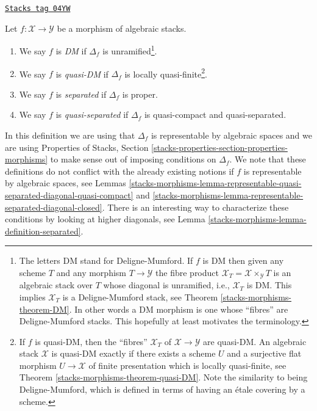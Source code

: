 \begin{definition}[Separated]
\label{stacks-morphisms-definition-separated}
\href{https://stacks.math.columbia.edu/tag/04YW}{\texttt{Stacks tag 04YW}}

Let $f : \mathcal{X} \to \mathcal{Y}$ be a morphism of algebraic stacks.
\begin{enumerate}
\item We say $f$ is {\it DM} if $\Delta_f$ is unramified\footnote{The
letters DM stand for Deligne-Mumford. If $f$ is DM then given any scheme
$T$ and any morphism $T \to \mathcal{Y}$ the fibre product
$\mathcal{X}_T = \mathcal{X} \times_\mathcal{Y} T$
is an algebraic stack over $T$ whose diagonal is unramified, i.e.,
$\mathcal{X}_T$ is DM. This implies $\mathcal{X}_T$
is a Deligne-Mumford stack, see Theorem \ref{stacks-morphisms-theorem-DM}.
In other words a DM morphism is one whose ``fibres'' are Deligne-Mumford
stacks. This hopefully at least motivates the terminology.}.
\item We say $f$ is {\it quasi-DM} if $\Delta_f$ is
locally quasi-finite\footnote{If $f$ is quasi-DM, then the
``fibres'' $\mathcal{X}_T$ of $\mathcal{X} \to \mathcal{Y}$ are quasi-DM. An
algebraic stack $\mathcal{X}$ is quasi-DM exactly if there exists a
scheme $U$ and a surjective flat morphism $U \to \mathcal{X}$ of finite
presentation which is locally quasi-finite, see
Theorem \ref{stacks-morphisms-theorem-quasi-DM}.
Note the similarity to being Deligne-Mumford, which
is defined in terms of having an \'etale covering by a scheme.}.
\item We say $f$ is {\it separated} if $\Delta_f$ is proper.
\item We say $f$ is {\it quasi-separated} if $\Delta_f$
is quasi-compact and quasi-separated.
\end{enumerate}
\end{definition}

In this definition we are using that $\Delta_f$ is representable by algebraic
spaces and we are using
Properties of Stacks,
Section \ref{stacks-properties-section-properties-morphisms}
to make sense out of imposing conditions on $\Delta_f$.
We note that these definitions do not conflict with the already
existing notions if $f$ is representable by algebraic spaces, see
Lemmas \ref{stacks-morphisms-lemma-representable-quasi-separated-diagonal-quasi-compact} and
\ref{stacks-morphisms-lemma-representable-separated-diagonal-closed}.
There is an interesting way to characterize these conditions by looking
at higher diagonals, see
Lemma \ref{stacks-morphisms-lemma-definition-separated}.

